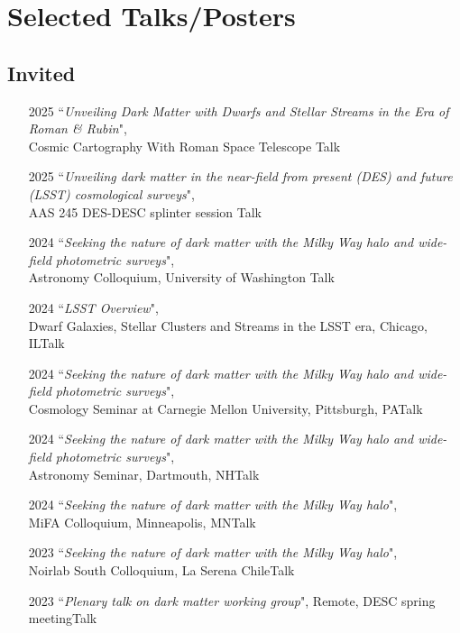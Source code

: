 \documentclass[11pt,letterpaper, sans]{moderncv}        %
\begin{document}
\section{Selected Talks/Posters}
\subsection{Invited}
\begin{itemize}[itemsep=1pt, leftmargin=28pt]
    \item [2025] ``\textit{Unveiling Dark Matter with Dwarfs and Stellar Streams in the Era of Roman \& Rubin}",\\
    Cosmic Cartography With Roman Space Telescope \hfill Talk
    \item [2025] ``\textit{Unveiling dark matter in the near-field from present (DES) and future (LSST) cosmological surveys}",\\
    AAS 245 DES-DESC splinter session \hfill Talk
    \item [2024] ``\textit{Seeking the nature of dark matter with the Milky Way halo and wide-field photometric surveys}", \\
    Astronomy Colloquium, University of Washington \hfill Talk
    \item [2024] ``\textit{LSST Overview}",\\
    Dwarf Galaxies, Stellar Clusters and Streams in the LSST era, Chicago, IL\hfill Talk
    \item [2024] ``\textit{Seeking the nature of dark matter with the Milky Way halo and wide-field photometric surveys}", \\
    Cosmology Seminar at Carnegie Mellon University, Pittsburgh, PA\hfill Talk
    \item [2024] ``\textit{Seeking the nature of dark matter with the Milky Way halo and wide-field photometric surveys}", \\
    Astronomy Seminar, Dartmouth, NH\hfill Talk
    \item [2024] ``\textit{Seeking the nature of dark matter with the Milky Way halo}", \\
    MiFA Colloquium, Minneapolis, MN\hfill Talk
    \item [2023] ``\textit{Seeking the nature of dark matter with the Milky Way halo}", \\
    Noirlab South Colloquium, La Serena Chile\hfill Talk
    \item [2023]``\textit{Plenary talk on dark matter working group}",
    Remote, DESC spring meeting\hfill Talk

\end{itemize}
\end{document}
